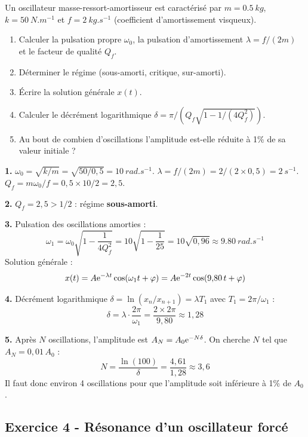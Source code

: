 \documentclass[12pt,a4paper]{article}
\begin{document}
\begin{boiteexercice}
Un oscillateur masse-ressort-amortisseur est caractérisé par $m = \qty{0.5}{kg}$, $k = \qty{50}{N.m^{-1}}$ et $f = \qty{2}{kg.s^{-1}}$ (coefficient d'amortissement visqueux).
\begin{enumerate}
  \item Calculer la pulsation propre $\omega_0$, la pulsation d'amortissement $\lambda = f/(2m)$ et le facteur de qualité $Q_f$.
  \item Déterminer le régime (sous-amorti, critique, sur-amorti).
  \item Écrire la solution générale $x(t)$.
  \item Calculer le décrément logarithmique $\delta = \pi/(Q_f\sqrt{1-1/(4Q_f^2)})$.
  \item Au bout de combien d'oscillations l'amplitude est-elle réduite à 1\% de sa valeur initiale ?
\end{enumerate}
\end{boiteexercice}

\begin{boitecorrige}
\textbf{1.} $\omega_0 = \sqrt{k/m} = \sqrt{50/0{,}5} = \qty{10}{rad.s^{-1}}$. $\lambda = f/(2m) = 2/(2\times0{,}5) = \qty{2}{s^{-1}}$.
$Q_f = m\omega_0/f = 0{,}5\times10/2 = 2{,}5$.

\textbf{2.} $Q_f = 2{,}5 > 1/2$ : régime \textbf{sous-amorti}.

\textbf{3.} Pulsation des oscillations amorties :
\[
\omega_1 = \omega_0\sqrt{1-\frac{1}{4Q_f^2}} = 10\sqrt{1-\frac{1}{25}} = 10\sqrt{0{,}96} \approx \qty{9.80}{rad.s^{-1}}
\]
Solution générale :
\[
x(t) = A\mathrm{e}^{-\lambda t}\cos(\omega_1 t+\varphi) = A\mathrm{e}^{-2t}\cos(9{,}80\,t+\varphi)
\]

\textbf{4.} Décrément logarithmique $\delta = \ln(x_n/x_{n+1}) = \lambda T_1$ avec $T_1 = 2\pi/\omega_1$ :
\[
\delta = \lambda\cdot\frac{2\pi}{\omega_1} = \frac{2\times2\pi}{9{,}80} \approx 1{,}28
\]

\textbf{5.} Après $N$ oscillations, l'amplitude est $A_N = A_0\mathrm{e}^{-N\delta}$. On cherche $N$ tel que $A_N = 0{,}01\,A_0$ :
\[
N = \frac{\ln(100)}{\delta} = \frac{4{,}61}{1{,}28} \approx 3{,}6
\]
Il faut donc environ 4 oscillations pour que l'amplitude soit inférieure à 1\% de $A_0$.
\end{boitecorrige}

\subsection*{Exercice 4 - Résonance d'un oscillateur forcé \niveau{\difficile}}
\end{document}
